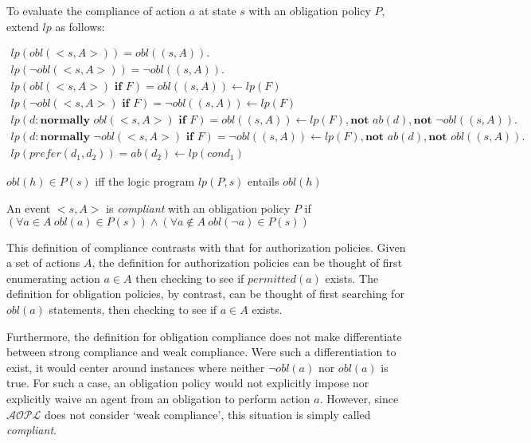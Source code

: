 To evaluate the compliance of action $a$ at state $s$ with an obligation policy $P$, \citet{gelfond_authorization_2008} extend $lp$ as follows:

\begin{gather*}
    lp(obl(<s,A>)) =
        obl((s,A)). \\
    lp(\neg obl(<s, A>)) =
        \neg obl((s, A)). \\
    lp(obl(<s, A>) \textbf{ if } F) =
        obl((s,A)) \leftarrow
            lp(F) \\
    lp(\neg obl(<s, A>) \textbf{ if } F) =
        \neg obl((s,A)) \leftarrow
            lp(F) \\
    lp(d: \textbf{normally } obl(<s, A>) \textbf{ if } F) =
        obl((s,A)) \leftarrow
            lp(F),
            \textbf{not } ab(d),
            \textbf{not } \neg obl((s, A)). \\
    lp(d: \textbf{normally } \neg obl(<s, A>) \textbf{ if } F) =
        \neg obl((s,A)) \leftarrow
            lp(F),
            \textbf{not } ab(d),
            \textbf{not } obl((s, A)). \\
    lp(prefer(d_1, d_2)) =
        ab(d_2) \leftarrow lp(cond_1)
\end{gather*}

\begin{definition}
    $obl(h) \in P(s)$ iff the logic program $lp(P, s)$ entails $obl(h)$
\end{definition}

\begin{definition}
    An event $<s, A>$ is \textit{compliant} with an obligation policy $P$ if $(\forall a \in A \ obl(a) \in P(s)) \land (\forall a \not \in A \ obl(\neg a) \in P(s))$
\end{definition}

This definition of compliance contrasts with that for authorization policies.
Given a set of actions $A$, the definition for authorization policies can be thought of first enumerating action $a \in A$ then checking to see if $permitted(a)$ exists.
The definition for obligation policies, by contrast, can be thought of first searching for $obl(a)$ statements, then checking to see if $a \in A$ exists.

Furthermore, the definition for obligation compliance does not make differentiate between strong compliance and weak compliance.
Were such a differentiation to exist, it would center around instances where neither $\neg obl(a)$ nor $obl(a)$ is true.
For such a case, an obligation policy would not explicitly impose nor explicitly waive an agent from an obligation to perform action $a$.
However, since $\mathcal{AOPL}$ does not consider `weak compliance', this situation is simply called \textit{compliant}.

